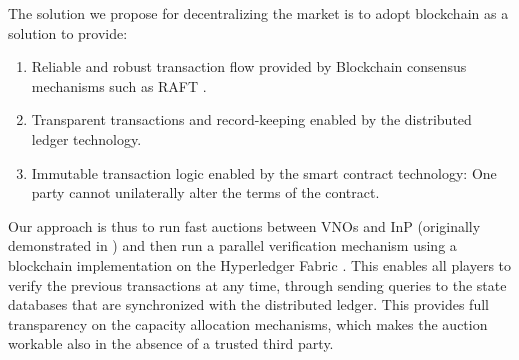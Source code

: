 The solution we propose for decentralizing the market is to adopt blockchain as a solution to provide:
\begin{enumerate}
    \item Reliable and robust transaction flow provided by Blockchain consensus mechanisms such as RAFT \cite{Ongaro:raft}.
    \item Transparent transactions and record-keeping enabled by the distributed ledger technology.
    \item Immutable transaction logic enabled by the smart contract technology: One party cannot unilaterally alter the terms of the contract.
\end{enumerate}

Our approach is thus to run fast auctions between \acp{VNO} and \ac{InP} (originally demonstrated in \cite{7936877}) and then run a parallel verification mechanism using a blockchain implementation on the Hyperledger Fabric \cite{fabric}. This enables all players to verify the previous transactions at any time, through sending queries to the state databases that are synchronized with the distributed ledger. This provides full transparency on the capacity allocation mechanisms, which makes the auction workable also in the absence of a trusted third party.



